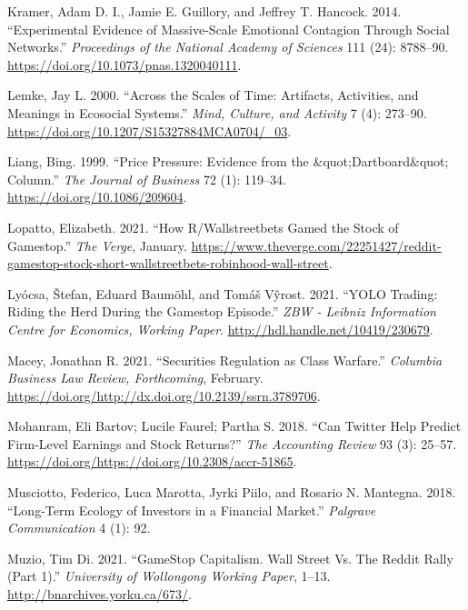 \documentclass[12pt,]{article}
\begin{document}
\leavevmode\hypertarget{ref-kramer2014}{}%
Kramer, Adam D. I., Jamie E. Guillory, and Jeffrey T. Hancock. 2014.
``Experimental Evidence of Massive-Scale Emotional Contagion Through
Social Networks.'' \emph{Proceedings of the National Academy of
Sciences} 111 (24): 8788--90.
\url{https://doi.org/10.1073/pnas.1320040111}.

\leavevmode\hypertarget{ref-lemke}{}%
Lemke, Jay L. 2000. ``Across the Scales of Time: Artifacts, Activities,
and Meanings in Ecosocial Systems.'' \emph{Mind, Culture, and Activity}
7 (4): 273--90. \url{https://doi.org/10.1207/S15327884MCA0704/_03}.

\leavevmode\hypertarget{ref-liang1999}{}%
Liang, Bing. 1999. ``Price Pressure: Evidence from the
\&quot;Dartboard\&quot; Column.'' \emph{The Journal of Business} 72 (1):
119--34. \url{https://doi.org/10.1086/209604}.

\leavevmode\hypertarget{ref-lopatto2021}{}%
Lopatto, Elizabeth. 2021. ``How R/Wallstreetbets Gamed the Stock of
Gamestop.'' \emph{The Verge}, January.
\url{https://www.theverge.com/22251427/reddit-gamestop-stock-short-wallstreetbets-robinhood-wall-street}.

\leavevmode\hypertarget{ref-lyocsa2021}{}%
Lyócsa, Štefan, Eduard Baumöhl, and Tomáš Vŷrost. 2021. ``YOLO Trading:
Riding the Herd During the Gamestop Episode.'' \emph{ZBW - Leibniz
Information Centre for Economics, Working Paper}.
\url{http://hdl.handle.net/10419/230679}.

\leavevmode\hypertarget{ref-macey2021}{}%
Macey, Jonathan R. 2021. ``Securities Regulation as Class Warfare.''
\emph{Columbia Business Law Review, Forthcoming}, February.
\url{https://doi.org/http://dx.doi.org/10.2139/ssrn.3789706}.

\leavevmode\hypertarget{ref-bartov2018}{}%
Mohanram, Eli Bartov; Lucile Faurel; Partha S. 2018. ``Can Twitter Help
Predict Firm-Level Earnings and Stock Returns?'' \emph{The Accounting
Review} 93 (3): 25--57.
\url{https://doi.org/https://doi.org/10.2308/accr-51865}.

\leavevmode\hypertarget{ref-musciotto2018}{}%
Musciotto, Federico, Luca Marotta, Jyrki Piilo, and Rosario N. Mantegna.
2018. ``Long-Term Ecology of Investors in a Financial Market.''
\emph{Palgrave Communication} 4 (1): 92.

\leavevmode\hypertarget{ref-dimuzio2021}{}%
Muzio, Tim Di. 2021. ``GameStop Capitalism. Wall Street Vs. The Reddit
Rally (Part 1).'' \emph{University of Wollongong Working Paper}, 1--13.
\url{http://bnarchives.yorku.ca/673/}.
\end{document}
